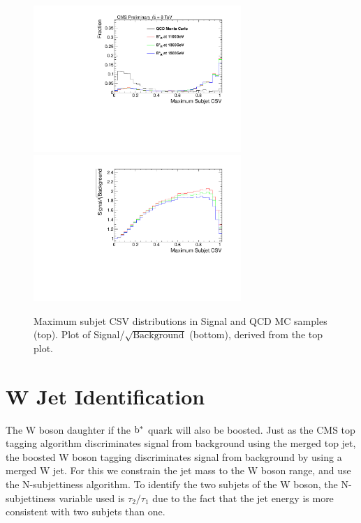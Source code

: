 \begin{figure}[htcb]
\begin{center}
\includegraphics[width=0.7\textwidth]{AN-14-049/figs/TopBDiscsjmaxCSVrightCompqcdandsignal.pdf}\\
\includegraphics[width=0.7\textwidth]{AN-14-049/figs/TopBDiscsjmaxCSVrightSNRqcdandsignal.pdf}
\caption{
Maximum subjet CSV distributions in Signal and QCD MC samples (top).  Plot of Signal/$\sqrt{\text{Background}}$ (bottom), derived from the top plot. 
}
\label{figs:bsBtagCOMP}
\end{center}
\end{figure}


\section{W Jet Identification}
\label{sec:bswtagging}
The W boson daughter if the $\mathrm{b}^{*}$ quark will also be boosted.  Just as the CMS top tagging algorithm discriminates signal from background 
using the merged top jet, the boosted W boson tagging discriminates signal from background by using a merged W jet.  For this we constrain the 
jet mass to the W boson range, and use the N-subjettiness algorithm.  To identify the two subjets of the W boson, the N-subjettiness variable used is 
$\tau_{2}/\tau_{1}$ due to the fact that the jet energy is more consistent with two subjets than one.
 
